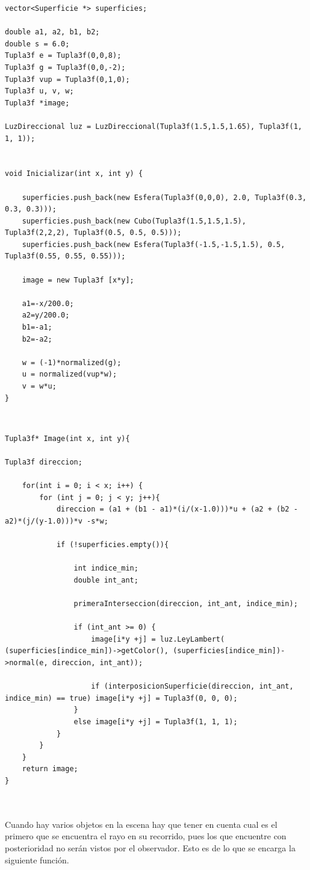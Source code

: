 \begin{lstlisting}[style=Consola]
vector<Superficie *> superficies;

double a1, a2, b1, b2;
double s = 6.0;
Tupla3f e = Tupla3f(0,0,8);
Tupla3f g = Tupla3f(0,0,-2);
Tupla3f vup = Tupla3f(0,1,0);
Tupla3f u, v, w;
Tupla3f *image;

LuzDireccional luz = LuzDireccional(Tupla3f(1.5,1.5,1.65), Tupla3f(1, 1, 1));


void Inicializar(int x, int y) {

	superficies.push_back(new Esfera(Tupla3f(0,0,0), 2.0, Tupla3f(0.3, 0.3, 0.3)));
	superficies.push_back(new Cubo(Tupla3f(1.5,1.5,1.5), Tupla3f(2,2,2), Tupla3f(0.5, 0.5, 0.5)));
	superficies.push_back(new Esfera(Tupla3f(-1.5,-1.5,1.5), 0.5, Tupla3f(0.55, 0.55, 0.55)));
	
	image = new Tupla3f [x*y];

	a1=-x/200.0;
	a2=y/200.0;
	b1=-a1;
	b2=-a2;

	w = (-1)*normalized(g);
	u = normalized(vup*w);
	v = w*u;
}

\end{lstlisting}
${ }$\\


\begin{lstlisting}[style=Consola]
Tupla3f* Image(int x, int y){

Tupla3f direccion;

	for(int i = 0; i < x; i++) {
		for (int j = 0; j < y; j++){
			direccion = (a1 + (b1 - a1)*(i/(x-1.0)))*u + (a2 + (b2 - a2)*(j/(y-1.0)))*v -s*w;

			if (!superficies.empty()){

				int indice_min;
				double int_ant;

				primeraInterseccion(direccion, int_ant, indice_min);

				if (int_ant >= 0) {
					image[i*y +j] = luz.LeyLambert( (superficies[indice_min])->getColor(), (superficies[indice_min])->normal(e, direccion, int_ant));

					if (interposicionSuperficie(direccion, int_ant, indice_min) == true) image[i*y +j] = Tupla3f(0, 0, 0);
				}
				else image[i*y +j] = Tupla3f(1, 1, 1);
			}
		}
	}
	return image;
}


\end{lstlisting}
${ }$\\

Cuando hay varios objetos en la escena hay que tener en cuenta cual es el primero que se encuentra el rayo en su recorrido, pues los que encuentre con posterioridad no serán vistos por el observador. Esto es de lo que se encarga la siguiente función.
${ }$\\

